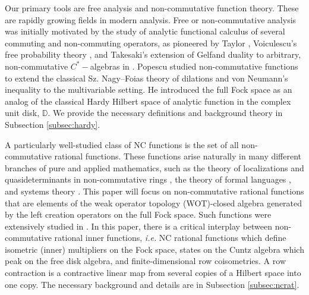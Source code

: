 \documentclass{article}
\theoremstyle{definition}
\theoremstyle{remark}
\numberwithin{equation}{section}
\def\D{\mathbb{D}}
\begin{document}
Our primary tools are free analysis and non-commutative function theory. These are rapidly growing fields in modern analysis. Free or non-commutative analysis was initially motivated by the study of analytic functional calculus of several commuting and non-commuting operators, as pioneered by Taylor \cite{Taylor-frame,Taylor-ncfunc}, Voiculescu's free probability theory \cite{Voiculescu-quest1,Voiculescu-quest2}, and Takesaki's extension of Gelfand duality to arbitrary, non-commutative $C^*-$algebras in \cite{Takesaki}. Popescu \cite{Pop-dil,Pop-vN,Pop-freeholo,Pop-freeholo2} studied non-commutative functions to extend the classical Sz. Nagy--Foias theory of dilations and von Neumann's inequality to the multivariable setting. He introduced the full Fock space as an analog of the classical Hardy Hilbert space of analytic function in the complex unit disk, $\D$. We provide the necessary definitions and background theory in Subsection \ref{subsec:hardy}.

A particularly well-studied class of NC functions is the set of all non-commutative rational functions. These functions arise naturally in many different branches of pure and applied mathematics, such as the theory of localizations and quasideterminants in non-commutative rings \cite{Amitsur,Cohn,GGRW}, the theory of formal languages \cite{BR,HW}, and systems theory \cite{BGM1,BKV}. This paper will focus on non-commutative rational functions that are elements of the weak operator topology (WOT)-closed algebra generated by the left creation operators on the full Fock space. Such functions were extensively studied in \cite{JMS-NCrat,JMS-ncratClark}. In this paper, there is a critical interplay between non-commutative rational inner functions, \emph{i.e.} NC rational functions which define isometric (inner) multipliers on the Fock space, states on the Cuntz algebra which peak on the free disk algebra, and finite-dimensional row coisometries. A row contraction is a contractive linear map from several copies of a Hilbert space into one copy. The necessary background and details are in Subsection \ref{subsec:ncrat}.
\end{document}
